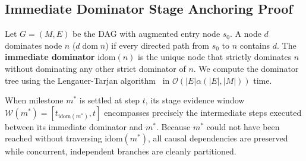 \subsection{Immediate Dominator Stage Anchoring Proof}
Let $G = (M, E)$ be the DAG with augmented entry node $s_0$. A node $d$ dominates node $n$ ($d \;\text{dom}\; n$) if every directed path from $s_0$ to $n$ contains $d$. The \textbf{immediate dominator} $\text{idom}(n)$ is the unique node that strictly dominates $n$ without dominating any other strict dominator of $n$. We compute the dominator tree using the Lengauer-Tarjan algorithm~\citep{lengauer1979fast} in $\mathcal{O}(|E| \alpha(|E|, |M|))$ time.

When milestone $m^*$ is settled at step $t$, its stage evidence window $\mathcal{W}(m^*) = [t_{\text{idom}(m^*)}, t]$ encompasses precisely the intermediate steps executed between its immediate dominator and $m^*$. Because $m^*$ could not have been reached without traversing $\text{idom}(m^*)$, all causal dependencies are preserved while concurrent, independent branches are cleanly partitioned.